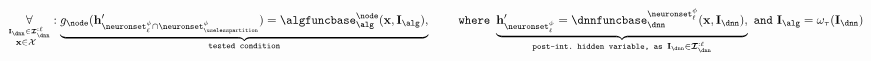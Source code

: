 \begin{lemma}
    \begin{align}
        \myforall_{\overset{\interventionsdnn \in \interventionsset^{:\layer}_{\dnn}}{\bx\in\calX\,\,\,\,}}:
        \underbrace{g_{\node}(\hiddenstates'_{\neuronset^{\causalmap}_{\layer} \cap \neuronset^{\causalmap}_{\uselesspartition}}) = \algfuncnode{\node}(\bx, \interventions_{\alg}),}_{\texttt{tested condition}} 
        \qquad\,\,\mathtt{where}\,\,
        \underbrace{\hiddenstates'_{\neuronset^{\causalmap}_{\layer}} =\dnnfunclayer{\neuronset^{\causalmap}_{\layer}}(\bx, \interventionsdnn),}_{\!\!\!\!\!\!\!\!\!\!\!\!\!\!\!\!\!\!\!\!\!\!\!\!\!\!\!\!\!\!\!\!\!\!\!\!\!\!\!\!\!\!\!\!\!\!\!\!
        \texttt{post-int.\ hidden variable, as }\interventionsdnn \in \interventionsset^{:\layer}_{\dnn}
        \!\!\!\!\!\!\!\!\!\!\!\!\!\!\!\!\!\!\!\!\!\!\!\!\!\!\!\!\!\!\!\!\!\!\!\!\!\!\!\!\!\!\!\!\!\!\!\!}
        \,\,\mathtt{and}\,\,
        \interventions_{\alg} = \omega_{\abstractionmap}(\interventionsdnn)
    \end{align}
\end{lemma}
